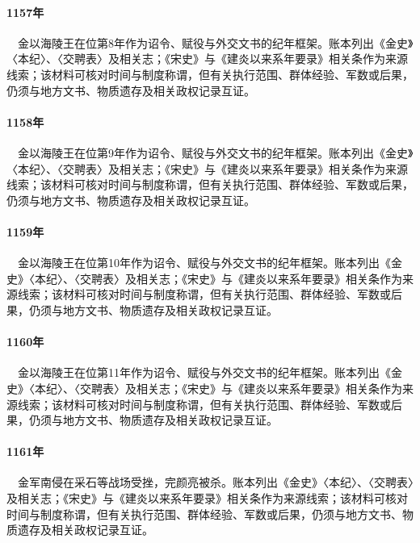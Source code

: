 \paragraph{1157年}　金以海陵王在位第8年作为诏令、赋役与外交文书的纪年框架。账本列出《金史》〈本纪〉、〈交聘表〉及相关志；《宋史》与《建炎以来系年要录》相关条作为来源线索；该材料可核对时间与制度称谓，但有关执行范围、群体经验、军数或后果，仍须与地方文书、物质遗存及相关政权记录互证。

\paragraph{1158年}　金以海陵王在位第9年作为诏令、赋役与外交文书的纪年框架。账本列出《金史》〈本纪〉、〈交聘表〉及相关志；《宋史》与《建炎以来系年要录》相关条作为来源线索；该材料可核对时间与制度称谓，但有关执行范围、群体经验、军数或后果，仍须与地方文书、物质遗存及相关政权记录互证。

\paragraph{1159年}　金以海陵王在位第10年作为诏令、赋役与外交文书的纪年框架。账本列出《金史》〈本纪〉、〈交聘表〉及相关志；《宋史》与《建炎以来系年要录》相关条作为来源线索；该材料可核对时间与制度称谓，但有关执行范围、群体经验、军数或后果，仍须与地方文书、物质遗存及相关政权记录互证。

\paragraph{1160年}　金以海陵王在位第11年作为诏令、赋役与外交文书的纪年框架。账本列出《金史》〈本纪〉、〈交聘表〉及相关志；《宋史》与《建炎以来系年要录》相关条作为来源线索；该材料可核对时间与制度称谓，但有关执行范围、群体经验、军数或后果，仍须与地方文书、物质遗存及相关政权记录互证。

\paragraph{1161年}　金军南侵在采石等战场受挫，完颜亮被杀。账本列出《金史》〈本纪〉、〈交聘表〉及相关志；《宋史》与《建炎以来系年要录》相关条作为来源线索；该材料可核对时间与制度称谓，但有关执行范围、群体经验、军数或后果，仍须与地方文书、物质遗存及相关政权记录互证。

